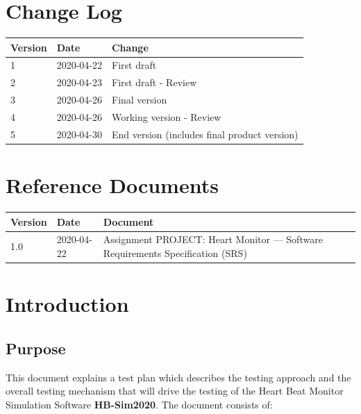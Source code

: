 \documentclass[a4paper]{article}
\begin{document}
\section*{Change Log}
\begin{longtable}[l]{ | m{60pt} | m{75pt} | m{265pt} |}
    
    \hline
    \rowcolor{vu-blue}
    \textcolor{vu-white}{\textbf{Version}} &
    \textcolor{vu-white}{\textbf{Date}} &
    \textcolor{vu-white}{\textbf{Change}} \\ \hline
    
    1 &
    2020-04-22 &
    First draft \\ \hline
    
    2 &
    2020-04-23 &
    First draft - Review \\ \hline
    
    3 &
    2020-04-26 &
    Final version \\ \hline
    
    4 &
    2020-04-26 &
    Working version - Review \\ \hline
    
    5 &
    2020-04-30 &
    End version (includes final product version) \\ \hline
\end{longtable}

\section*{Reference Documents}
\begin{longtable}[l]{ | m{60pt} | m{90pt} | m{250pt} | }
    
    \hline
    \rowcolor{vu-blue}
    \textcolor{vu-white}{\textbf{Version}} &
    \textcolor{vu-white}{\textbf{Date}} &
    \textcolor{vu-white}{\textbf{Document}} \\ \hline
    
    1.0 &
    2020-04-22 &
    Assignment PROJECT: Heart Monitor --- Software Requirements Specification (SRS) \\ \hline
    
\end{longtable}


\clearpage
\section{Introduction}

\subsection{Purpose}
This document explains a test plan which describes the testing approach and the overall testing mechanism that will drive the testing of the Heart Beat Monitor Simulation Software \textbf{HB-Sim2020}. The document consists of:
\end{document}
